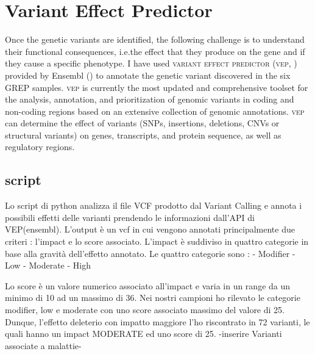 
\section{Variant Effect Predictor}
Once the genetic variants are identified, the following challenge is to understand their functional consequences, i.e.the effect that they produce on the gene and if they cause a specific phenotype. I have used \textsc{variant effect predictor} (\textsc{vep}, \cite{mclaren2016ensembl}) provided by Ensembl (\cite{howe2020ensembl}) to annotate the genetic variant discovered in the six GREP samples. \textsc{vep} is currently the most updated and comprehensive toolset for the analysis, annotation, and prioritization of genomic variants in coding and non-coding regions based on an extensive collection of genomic annotations. \textsc{vep} can determine the effect of variants (SNPs, insertions, deletions, CNVs or structural variants) on genes, transcripts, and protein sequence, as well as regulatory regions.\newline
\subsection{script}
Lo script di python analizza il file VCF prodotto dal Variant Calling e annota i possibili effetti delle varianti prendendo le informazioni dall'API di VEP(ensembl). L'output è un vcf in cui vengono annotati principalmente due criteri : l'impact e lo score associato. 
L'impact è suddiviso in quattro categorie in base alla gravità dell'effetto annotato.
Le quattro categorie sono : \newline
- Modifier\newline
- Low\newline
- Moderate\newline
- High\newline

Lo score è un valore numerico associato all'impact e varia in un range da un minimo di 10 ad un massimo di 36.
Nei nostri campioni ho rilevato le categorie modifier, low e moderate con uno score associato massimo del valore di 25. 
Dunque, l'effetto deleterio con impatto maggiore l'ho riscontrato in 72 varianti, le quali hanno un impact MODERATE ed uno score di 25. \newline-inserire Varianti associate a malattie-\newline
